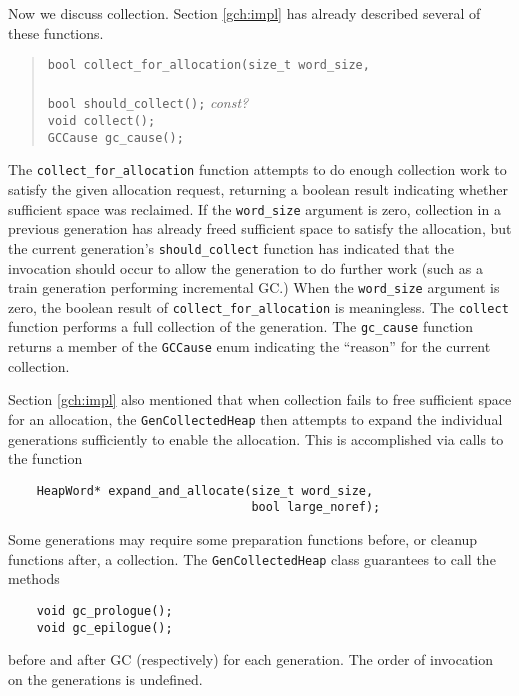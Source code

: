 \documentclass{article}
\begin{document}
Now we discuss collection.  Section \ref {gch:impl} has already
described several of these functions.
\begin{quote}
    {\tt bool collect\_for\_allocation(size\_t word\_size,} \\
\hspace*{2.05in}{\tt bool large\_noref);} \\
    {\tt bool should\_collect();} {\em const?} \\
    {\tt void collect();} \\
    {\tt GCCause gc\_cause();}
\end{quote}
The {\tt collect\_for\_allocation} function attempts to do enough
collection work to satisfy the given allocation request, returning a
boolean result indicating whether sufficient space was reclaimed.  If
the {\tt word\_size} argument is zero, collection in a previous
generation has already freed sufficient space to satisfy the
allocation, but the current generation's {\tt should\_collect} function
has indicated that the invocation should occur to allow the
generation to do further work (such as a train generation performing
incremental GC.)  When the {\tt word\_size} argument is zero, the
boolean result of {\tt collect\_for\_allocation} is meaningless.
  The {\tt collect} function performs a full collection
of the generation.  The {\tt gc\_cause} function returns a member of
the {\tt GCCause} enum indicating the ``reason'' for the current
collection.  

Section \ref {gch:impl} also mentioned that when collection fails to
free sufficient space for an allocation, the {\tt GenCollectedHeap}
then attempts to expand the individual generations sufficiently to
enable the allocation.  This is accomplished via calls to the function
\begin{verbatim}
    HeapWord* expand_and_allocate(size_t word_size,
                                  bool large_noref);
\end{verbatim}

Some generations may require some preparation functions before, or
cleanup functions after, a collection.  The {\tt GenCollectedHeap}
class guarantees to call the methods
\begin{verbatim}
    void gc_prologue();
    void gc_epilogue();
\end{verbatim}
before and after GC (respectively) for each generation.  The order of
invocation on the generations is undefined.  
\end{document}
